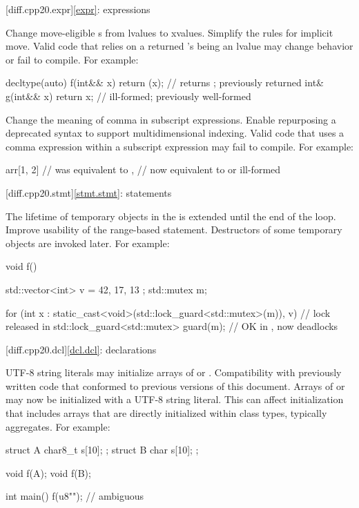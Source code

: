 [diff.cpp20.expr]{\ref{expr}: expressions}

\change
Change move-eligible s from lvalues to xvalues.
\rationale
Simplify the rules for implicit move.
\effect
Valid \CppXX{} code that relies on a returned 's
being an lvalue may change behavior or fail to compile.
For example:
\begin{codeblock}
decltype(auto) f(int&& x) { return (x); }       // returns ; previously returned 
int& g(int&& x) { return x; }                   // ill-formed; previously well-formed
\end{codeblock}

\change
Change the meaning of comma in subscript expressions.
\rationale
Enable repurposing a deprecated syntax to support multidimensional indexing.
\effect
Valid \CppXX{} code that uses a comma expression within a
subscript expression may fail to compile.
For example:
\begin{codeblock}
arr[1, 2]               // was equivalent to ,
                        // now equivalent to  or ill-formed
\end{codeblock}

[diff.cpp20.stmt]{\ref{stmt.stmt}: statements}

\change
The lifetime of temporary objects in the 
is extended until the end of the loop.
\rationale
Improve usability of the range-based  statement.
\effect
Destructors of some temporary objects are invoked later.
For example:
\begin{codeblock}
void f() {
  std::vector<int> v = { 42, 17, 13 };
  std::mutex m;

  for (int x :
       static_cast<void>(std::lock_guard<std::mutex>(m)), v) {  // lock released in \CppXX
    std::lock_guard<std::mutex> guard(m);                       // OK in \CppXX, now deadlocks
  }
}
\end{codeblock}

[diff.cpp20.dcl]{\ref{dcl.dcl}: declarations}

\change
UTF-8 string literals may initialize arrays of  or
.
\rationale
Compatibility with previously written code that conformed to previous versions of this document.
\effect
Arrays of  or 
may now be initialized with a UTF-8 string literal.
This can affect initialization that includes arrays
that are directly initialized within class types, typically aggregates.
For example:
\begin{codeblock}
struct A {
  char8_t s[10];
};
struct B {
  char s[10];
};

void f(A);
void f(B);

int main() {
  f({u8""});            // ambiguous
}
\end{codeblock}

